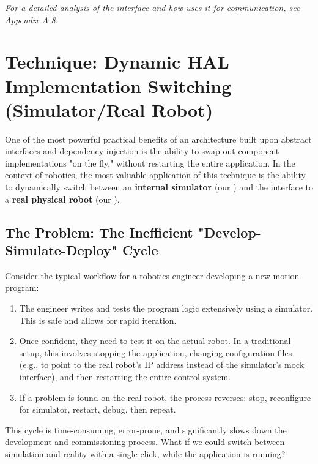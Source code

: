 \textit{For a detailed analysis of the  interface and how  uses it for communication, see Appendix A.8.}



\section{Technique: Dynamic HAL Implementation Switching (Simulator/Real Robot)}
\label{sec:dynamic_hal_switching_conceptual}

One of the most powerful practical benefits of an architecture built upon abstract interfaces and dependency injection is the ability to swap out component implementations "on the fly," without restarting the entire application. In the context of robotics, the most valuable application of this technique is the ability to dynamically switch between an \textbf{internal simulator} (our ) and the interface to a \textbf{real physical robot} (our ).

\subsection{The Problem: The Inefficient "Develop-Simulate-Deploy" Cycle}
\label{subsec:inefficient_cycle_conceptual}

Consider the typical workflow for a robotics engineer developing a new motion program:
\begin{enumerate}
    \item The engineer writes and tests the program logic extensively using a simulator. This is safe and allows for rapid iteration.
    \item Once confident, they need to test it on the actual robot. In a traditional setup, this involves stopping the application, changing configuration files (e.g., to point to the real robot's IP address instead of the simulator's mock interface), and then restarting the entire control system.
    \item If a problem is found on the real robot, the process reverses: stop, reconfigure for simulator, restart, debug, then repeat.
\end{enumerate}
This cycle is time-consuming, error-prone, and significantly slows down the development and commissioning process. What if we could switch between simulation and reality with a single click, while the application is running?

